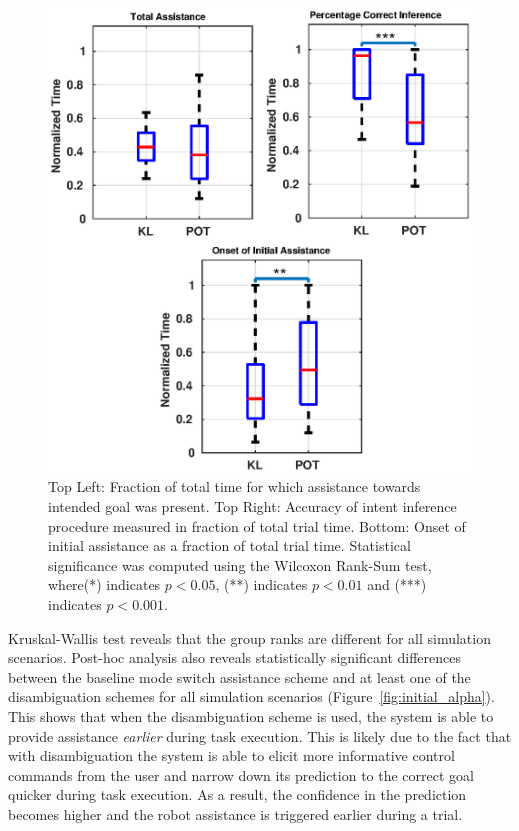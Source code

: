 \documentclass[conference]{IEEEtran}
\begin{document}
\begin{figure}[t!]
	\centering
	\includegraphics[width= 1.\hsize, height=1.3\vsize]{./figures/mico_sim_res.eps}
	\vspace{-0.5cm}
	\caption{Top Left: Fraction of total time for which assistance towards intended goal was present. Top Right: Accuracy of intent inference procedure measured in fraction of total trial time. Bottom: Onset of initial assistance as a fraction of total trial time. Statistical significance was computed using the Wilcoxon Rank-Sum test, where(*) indicates $p < 0.05$, (**) indicates $p < 0.01$ and (***) indicates $p < 0.001$. } 
	\label{fig:mico_results}
\end{figure}
Kruskal-Wallis test reveals that the group ranks are different for all simulation scenarios. Post-hoc analysis also reveals statistically significant differences between the baseline mode switch assistance scheme and at least one of the disambiguation schemes for all simulation scenarios (Figure~\ref{fig:initial_alpha}). This shows that when the disambiguation scheme is used, the system is able to provide assistance \textit{earlier} during task execution. This is likely due to the fact that with disambiguation the system is able to elicit more informative control commands from the user and narrow down its prediction to the correct goal quicker during task execution. As a result, the confidence in the prediction becomes higher and the robot assistance is triggered earlier during a trial. 
\end{document}
